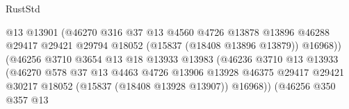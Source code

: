 \begin{lexlean}{RustStd}
\begin{coremodule}
{\begin{coremodule}
{{{{{{{{{{{{{{{{{{{{{{{{{{{{{{{{{{{{{{{{{{{{{{{{{{{{{{{{{{{{                                              @13
                                              @13901
                                              (@46270
                                                @316
                                                @37
                                                @13
                                                @4560
                                                @4726
                                                @13878
                                                @13896
                                                @46288
                                                @29417
                                                @29421
                                                @29794
                                                @18052
                                                (@15837 (@18408 @13896 @13879))
                                                @16968))
                                            (@46256
                                              @3710
                                              @3654
                                              @13
                                              @18
                                              @13933
                                              @13983
                                              (@46236
                                                @3710
                                                @13
                                                @13933
                                                (@46270
                                                  @578
                                                  @37
                                                  @13
                                                  @4463
                                                  @4726
                                                  @13906
                                                  @13928
                                                  @46375
                                                  @29417
                                                  @29421
                                                  @30217
                                                  @18052
                                                  (@15837 (@18408 @13928 @13907))
                                                  @16968))
                                              (@46256
                                                @350
                                                @357
                                                @13
}}}}}}}}}}}}}}}}}}}}}}}}}}}}}}}}}}}}}}}}}}}}}}}}}}}}}}}}}}}}
\end{coremodule}}
\end{coremodule}
\end{lexlean}
